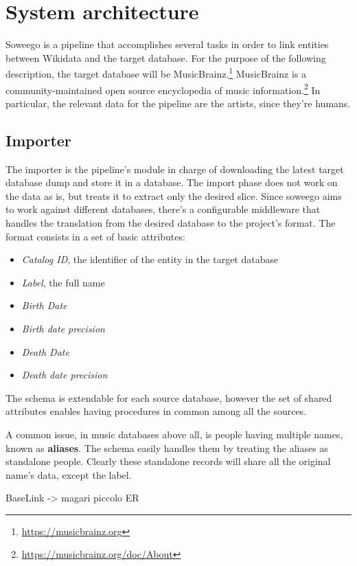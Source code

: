 \chapter{System architecture}
\label{cha:4}

Soweego is a pipeline that accomplishes several tasks in order to link entities between Wikidata and the target database. For the purpose of the following description, the target database will be MusicBrainz.\footnote{\url{https://musicbrainz.org}} MusicBrainz is a community-maintained open source encyclopedia of music information.\footnote{\url{https://musicbrainz.org/doc/About}} In particular, the relevant data for the pipeline are the artists, since they're humans.

\section{Importer}
\label{cha:41}
The importer is the pipeline's module in charge of downloading the latest target database dump and store it in a database. The import phase does not work on the data as is, but treats it to extract only the desired slice. Since soweego aims to work against different databases, there's a configurable middleware that handles the translation from the desired database to the project's format. The format consists in a set of basic attributes:
\begin{itemize}
    \item \textit{Catalog ID}, the identifier of the entity in the target database
    \item \textit{Label}, the full name
    \item \textit{Birth Date}
    \item \textit{Birth date precision}
    \item \textit{Death Date}
    \item \textit{Death date precision}
\end{itemize}
The schema is extendable for each source database, however the set of shared attributes enables having procedures in common among all the sources.

A common issue, in music databases above all, is people having   multiple names, known as \textbf{aliases}. The schema easily handles them by treating the aliases as standalone people. Clearly these standalone records will share all the original name's data, except the label.

BaseLink -> magari piccolo ER

